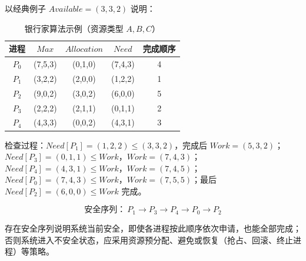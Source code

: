 \noindent 以经典例子 $Available=(3,3,2)$ 说明：

\begin{table}[H]
\centering
\caption{银行家算法示例（资源类型 $A,B,C$）}
\begin{tabulary}{\textwidth}{CCCCC}
\toprule
进程 & $Max$ & $Allocation$ & $Need$ & 完成顺序 \\
\midrule
$P_0$ & (7,5,3) & (0,1,0) & (7,4,3) & 4 \\
$P_1$ & (3,2,2) & (2,0,0) & (1,2,2) & 1 \\
$P_2$ & (9,0,2) & (3,0,2) & (6,0,0) & 5 \\
$P_3$ & (2,2,2) & (2,1,1) & (0,1,1) & 2 \\
$P_4$ & (4,3,3) & (0,0,2) & (4,3,1) & 3 \\
\bottomrule
\end{tabulary}
\end{table}

检查过程：$Need[P_1]=(1,2,2)\le(3,3,2)$，完成后 $Work=(5,3,2)$；$Need[P_3]=(0,1,1)\le Work$，$Work=(7,4,3)$；$Need[P_4]=(4,3,1)\le Work$，$Work=(7,4,5)$；$Need[P_0]=(7,4,3)\le Work$，$Work=(7,5,5)$；最后 $Need[P_2]=(6,0,0)\le Work$ 完成。

\begin{equation}
    \text{安全序列：}\ P_1 \to P_3 \to P_4 \to P_0 \to P_2
\end{equation}

存在安全序列说明系统当前安全，即使各进程按此顺序依次申请，也能全部完成；否则系统进入不安全状态，应采用资源预分配、避免或恢复（抢占、回滚、终止进程）等策略。
